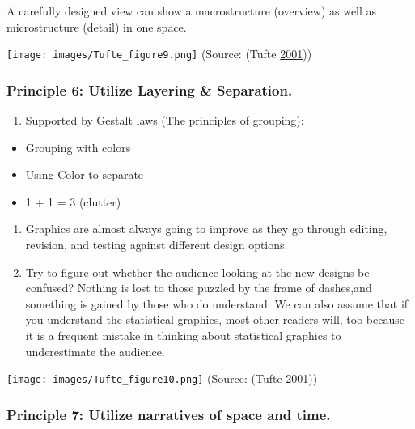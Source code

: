 \documentclass[]{book}
\providecommand{\tightlist}{%
  \setlength{\itemsep}{0pt}\setlength{\parskip}{0pt}}
\begin{document}
A carefully designed view can show a macrostructure (overview) as well as microstructure (detail) in one space.

\texttt{[image: images/Tufte\_figure9.png]}
(Source: (Tufte \protect\hyperlink{ref-Tufte_2001}{2001}))

\hypertarget{principle-6-utilize-layering-separation.}{%
\subsubsection{Principle 6: Utilize Layering \& Separation.}\label{principle-6-utilize-layering-separation.}}

\begin{enumerate}
\def\labelenumi{\arabic{enumi}.}
\tightlist
\item
  Supported by Gestalt laws (The principles of grouping):
\end{enumerate}

\begin{itemize}
\tightlist
\item
  Grouping with colors
\item
  Using Color to separate
\item
  1 + 1 = 3 (clutter)
\end{itemize}

\begin{enumerate}
\def\labelenumi{\arabic{enumi}.}
\setcounter{enumi}{1}
\item
  Graphics are almost always going to improve as they go through editing, revision, and testing against different design options.
\item
  Try to figure out whether the audience looking at the new designs be confused? Nothing is lost to those puzzled by the frame of dashes,and something is gained by those who do understand. We can also assume that if you understand the statistical graphics, most other readers will, too because it is a frequent mistake in thinking about statistical graphics to underestimate the audience.
\end{enumerate}

\texttt{[image: images/Tufte\_figure10.png]}
(Source: (Tufte \protect\hyperlink{ref-Tufte_2001}{2001}))

\hypertarget{principle-7-utilize-narratives-of-space-and-time.}{%
\subsubsection{Principle 7: Utilize narratives of space and time.}\label{principle-7-utilize-narratives-of-space-and-time.}}
\end{document}
